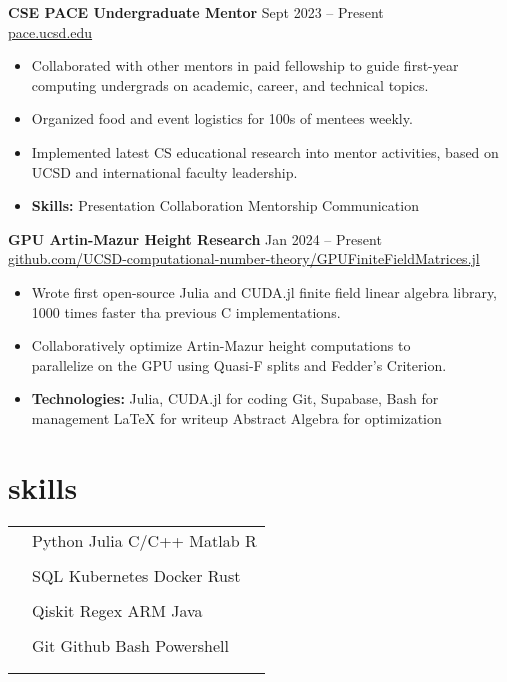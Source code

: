 \documentclass[11pt]{article}
\newcommand{\entry}[3]{{{\textbf{#1}}} \hfill #2 \\ #3 \hfill \hspace{0em}}
\newcommand{\tableentry}[3]{\textsc{#1} & #2\expandafter\ifstrequal\expandafter{#3}{}{\\}{\\[6pt]}}
\renewcommand{\>}{\textperiodcentered{}}
\begin{document}
\begin{paracol}{2}
\entry{CSE PACE Undergraduate Mentor}{Sept 2023 -- Present}
{\href{https://pace.ucsd.edu/}{\footnotesize pace.ucsd.edu \normalsize}}
\begin{itemize}[noitemsep,leftmargin=3.5mm,rightmargin=0mm,topsep=3pt]
    \item Collaborated with other mentors in paid fellowship to guide first-year computing undergrads on academic, career, and technical topics.
    \item Organized food and event logistics for 100s of mentees weekly.
    \item Implemented latest CS educational research into mentor activities, based on UCSD and international faculty leadership.
    \item \textbf{Skills:} Presentation \> Collaboration \> Mentorship \> Communication
\end{itemize}
\medskip

\entry{GPU Artin-Mazur Height Research}{Jan 2024 -- Present}
{\href{https://github.com/UCSD-computational-number-theory/GPUFiniteFieldMatrices.jl}{\footnotesize github.com/UCSD-computational-number-theory/GPUFiniteFieldMatrices.jl \normalsize}}
\begin{itemize}[noitemsep,leftmargin=3.5mm,rightmargin=0mm,topsep=3pt]
    \item Wrote first open-source Julia and CUDA.jl finite field linear algebra library, 1000 times faster tha previous C implementations.
    \item Collaboratively optimize Artin-Mazur height computations to \\ parallelize on the GPU using Quasi-F splits and Fedder's Criterion.
    \item \textbf{Technologies:} Julia, CUDA.jl for coding \> Git, Supabase, Bash for management \> LaTeX for writeup \> Abstract Algebra for optimization
\end{itemize}
\medskip

\switchcolumn

\section{skills}
\begin{supertabular}{rl}

\tableentry{\footnotesize\faCode}
{Python \> Julia \> C/C++ \> Matlab \> R}{}
\tableentry{}{SQL \> Kubernetes \> Docker \> Rust}{}
\tableentry{}{Qiskit \> Regex \> ARM \> Java}{}
\vspace{0.5em}
\tableentry{}{Git \> Github \> Bash \> Powershell}{}


\end{supertabular}
\end{paracol}
\end{document}
